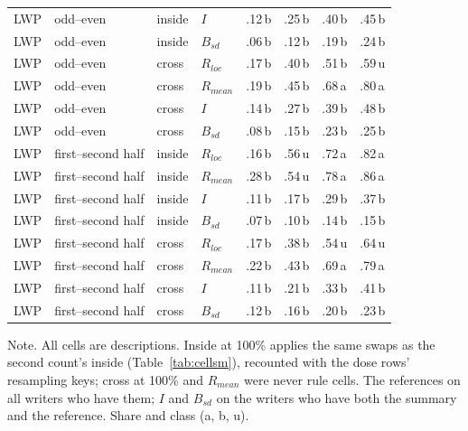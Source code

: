 \begin{table}[htbp]
\begin{tabularx}{\linewidth}{@{}llllXXXX@{}}
LWP & odd--even & inside & $I$ & .12\,b & .25\,b & .40\,b & .45\,b \\
LWP & odd--even & inside & $B_{sd}$ & .06\,b & .12\,b & .19\,b & .24\,b \\
LWP & odd--even & cross & $R_{loc}$ & .17\,b & .40\,b & .51\,b & .59\,u \\
LWP & odd--even & cross & $R_{mean}$ & .19\,b & .45\,b & .68\,a & .80\,a \\
LWP & odd--even & cross & $I$ & .14\,b & .27\,b & .39\,b & .48\,b \\
LWP & odd--even & cross & $B_{sd}$ & .08\,b & .15\,b & .23\,b & .25\,b \\
LWP & first--second half & inside & $R_{loc}$ & .16\,b & .56\,u & .72\,a & .82\,a \\
LWP & first--second half & inside & $R_{mean}$ & .28\,b & .54\,u & .78\,a & .86\,a \\
LWP & first--second half & inside & $I$ & .11\,b & .17\,b & .29\,b & .37\,b \\
LWP & first--second half & inside & $B_{sd}$ & .07\,b & .10\,b & .14\,b & .15\,b \\
LWP & first--second half & cross & $R_{loc}$ & .17\,b & .38\,b & .54\,u & .64\,u \\
LWP & first--second half & cross & $R_{mean}$ & .22\,b & .43\,b & .69\,a & .79\,a \\
LWP & first--second half & cross & $I$ & .11\,b & .21\,b & .33\,b & .41\,b \\
LWP & first--second half & cross & $B_{sd}$ & .12\,b & .16\,b & .20\,b & .23\,b \\
\bottomrule
\end{tabularx}
\par\smallskip\footnotesize Note. All cells are descriptions. Inside at 100\% applies the same swaps as the second count's inside (Table~\ref{tab:cellsm}), recounted with the dose rows' resampling keys; cross at 100\% and $R_{mean}$ were never rule cells. The references on all writers who have them; $I$ and $B_{sd}$ on the writers who have both the summary and the reference. Share and class (a, b, u).
\end{table}
